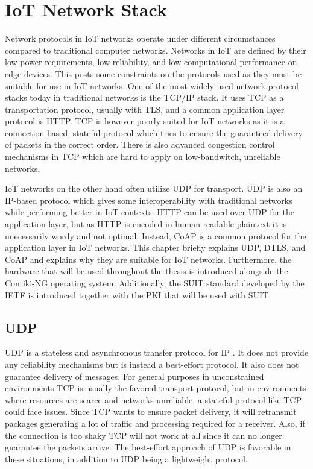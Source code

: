 \documentclass[0-thesis.tex]{subfiles}
\begin{document}
\section{IoT Network Stack}
Network protocols in IoT networks operate under different circumstances compared to traditional 
computer networks. Networks in IoT are defined by their low power requirements, low reliability, 
and low computational performance on edge devices. This posts some constraints on the protocols 
used as they must be suitable for use in IoT networks. One of the most widely used network 
protocol stacks today in traditional networks is the TCP/IP stack. It uses TCP as a transportation 
protocol, usually with TLS, and a common application layer protocol is HTTP. TCP is however 
poorly suited for IoT networks as it is a connection based, stateful protocol which tries to 
ensure the guaranteed delivery of packets in the correct order. There is also advanced congestion 
control mechanisms in TCP which are hard to apply on low-bandwitch, unreliable networks.


IoT networks on the other hand often utilize UDP for transport. UDP is also an IP-based protocol 
which gives some interoperability with traditional networks while performing better in IoT 
contexts. HTTP can be used over UDP for the application layer, but as HTTP is encoded in 
human readable plaintext it is unecessarily wordy and not optimal. Instead, CoAP is a common 
protocol for the application layer in IoT networks. This chapter briefly explains UDP, DTLS, 
and CoAP and explains why they are suitable for IoT networks. Furthermore, the hardware that 
will be used throughout the thesis is introduced alongside the Contiki-NG operating system. 
Additionally, the SUIT standard developed by the IETF is introduced together with the PKI 
that will be used with SUIT.

\subsection{UDP}
UDP is a stateless and asynchronous transfer protocol for IP \parencite{rfc768}. It does not provide any 
reliability mechanisms but is instead a best-effort protocol. It also does not guarantee 
delivery of messages. For general purposes in unconstrained environments TCP is usually the 
favored transport protocol, but in environments where resources are scarce and networks 
unreliable, a stateful protocol like TCP could face issues. Since TCP wants to ensure packet 
delivery, it will retransmit packages generating a lot of traffic and processing required for 
a receiver. Also, if the connection is too shaky TCP will not work at all since it can no 
longer guarantee the packets arrive. The best-effort approach of UDP is favorable in these
situations, in addition to UDP being a lightweight protocol.
\end{document}
